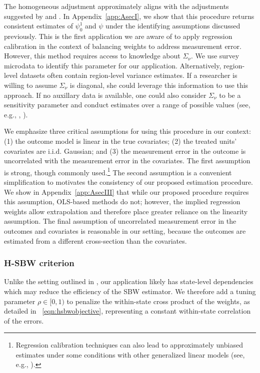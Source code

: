 \documentclass[aoas]{imsart}
\theoremstyle{plain}
\theoremstyle{remark}
\begin{document}
The homogeneous adjustment approximately aligns with the adjustments suggested by \cite{carroll2006measurement} and \cite{gleser1992importance}. In Appendix~\ref{app:AsecI}, we show that this procedure returns consistent estimates of $\psi_0^1$ and $\psi$ under the identifying assumptions discussed previously. This is the first application we are aware of to apply regression calibration in the context of balancing weights to address measurement error. However, this method requires access to knowledge about $\Sigma_{\nu}$. We use survey microdata to identify this parameter for our application. Alternatively, region-level datasets often contain region-level variance estimates. If a researcher is willing to assume $\Sigma_{\nu}$ is diagonal, she could leverage this information to use this approach. If no auxillary data is available, one could also consider $\Sigma_{\nu}$ to be a sensitivity parameter and conduct estimates over a range of possible values (see, e.g., \cite{illenberger2020impact}, \cite{huque2014impact}). 

We emphasize three critical assumptions for using this procedure in our context: (1) the outcome model is linear in the true covariates; (2) the treated units' covariates are i.i.d. Gaussian; and (3) the measurement error in the outcome is uncorrelated with the measurement error in the covariates. The first assumption is strong, though commonly used.\footnote{Regression calibration techniques can also lead to approximately unbiased estimates under some conditions with other generalized linear models (see, e.g., \cite{spiegelman2001efficient}).} The second assumption is a convenient simplification to motivates the consistency of our proposed estimation procedure. We show in Appendix~\ref{app:AsecIII} that while our proposed procedure requires this assumption, OLS-based methods do not; however, the implied regression weights allow extrapolation and therefore place greater reliance on the linearity assumption. The final assumption of uncorrelated measurement error in the outcomes and covariates is reasonable in our setting, because the outcomes are estimated from a different cross-section than the covariates. 

\subsubsection{H-SBW criterion}\label{sssec:hsbw}

Unlike the setting outlined in \cite{zubizarreta2015stable}, our application likely has state-level dependencies which may reduce the efficiency of the SBW estimator. We therefore add a tuning parameter $\rho \in [0, 1)$ to penalize the within-state cross product of the weights, as detailed in ~\eqref{eqn:hsbwobjective}, representing a constant within-state correlation of the errors.
\end{document}
